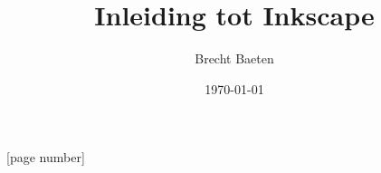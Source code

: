 
\usepackage[dutch]{babel}               %
\usepackage{url}                        %
\usepackage{graphicx,subfigure}         %
\usepackage[utf8]{inputenc}             %
\usepackage{multicol}
\usepackage[absolute,overlay]{textpos}

[page number]


\title{Inleiding tot Inkscape}
\author{Brecht Baeten}
\date{\today}
